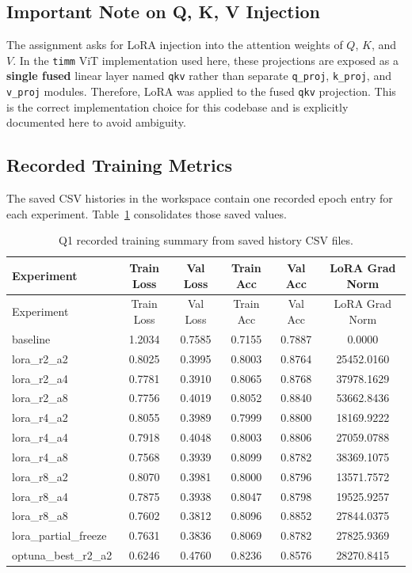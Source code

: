 \documentclass[11pt]{article}
\begin{document}
\subsection{Important Note on Q, K, V Injection}
The assignment asks for LoRA injection into the attention weights of \(Q\), \(K\), and \(V\). In the \texttt{timm} ViT implementation used here, these projections are exposed as a \textbf{single fused} linear layer named \texttt{qkv} rather than separate \texttt{q\_proj}, \texttt{k\_proj}, and \texttt{v\_proj} modules. Therefore, LoRA was applied to the fused \texttt{qkv} projection. This is the correct implementation choice for this codebase and is explicitly documented here to avoid ambiguity.

\subsection{Recorded Training Metrics}
The saved CSV histories in the workspace contain one recorded epoch entry for each experiment. Table~\ref{tab:q1-train} consolidates those saved values.

\begin{longtable}{lccccc}
\caption{Q1 recorded training summary from saved history CSV files.}
\label{tab:q1-train}\\
\toprule
Experiment & Train Loss & Val Loss & Train Acc & Val Acc & LoRA Grad Norm \\
\midrule
\endfirsthead
\toprule
Experiment & Train Loss & Val Loss & Train Acc & Val Acc & LoRA Grad Norm \\
\midrule
\endhead
baseline & 1.2034 & 0.7585 & 0.7155 & 0.7887 & 0.0000 \\
lora\_r2\_a2 & 0.8025 & 0.3995 & 0.8003 & 0.8764 & 25452.0160 \\
lora\_r2\_a4 & 0.7781 & 0.3910 & 0.8065 & 0.8768 & 37978.1629 \\
lora\_r2\_a8 & 0.7756 & 0.4019 & 0.8052 & 0.8840 & 53662.8436 \\
lora\_r4\_a2 & 0.8055 & 0.3989 & 0.7999 & 0.8800 & 18169.9222 \\
lora\_r4\_a4 & 0.7918 & 0.4048 & 0.8003 & 0.8806 & 27059.0788 \\
lora\_r4\_a8 & 0.7568 & 0.3939 & 0.8099 & 0.8782 & 38369.1075 \\
lora\_r8\_a2 & 0.8070 & 0.3981 & 0.8000 & 0.8796 & 13571.7572 \\
lora\_r8\_a4 & 0.7875 & 0.3938 & 0.8047 & 0.8798 & 19525.9257 \\
lora\_r8\_a8 & 0.7602 & 0.3812 & 0.8096 & 0.8852 & 27844.0375 \\
lora\_partial\_freeze & 0.7631 & 0.3836 & 0.8069 & 0.8782 & 27825.9369 \\
optuna\_best\_r2\_a2 & 0.6246 & 0.4760 & 0.8236 & 0.8576 & 28270.8415 \\
\bottomrule
\end{longtable}
\end{document}
